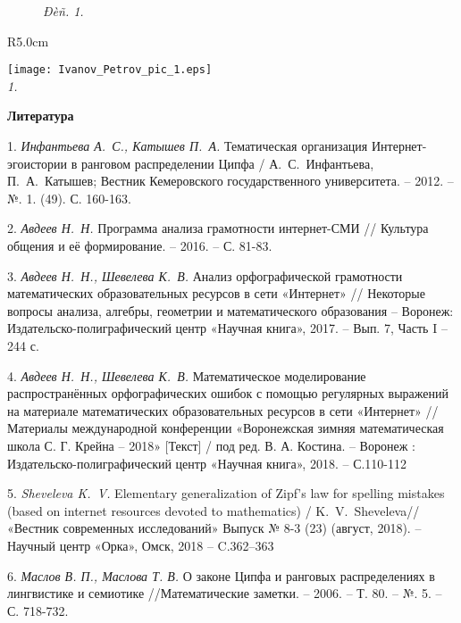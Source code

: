\documentclass[draft, 12pt]{article}
\begin{document}
\begin{figure}[h!]
\begin{center}
\emph{Ðèñ. 1. }
\end{center}
\end{figure}


\begin{wrapfigure}{R}{5.0cm}
\begin{center}
\texttt{[image: Ivanov\_Petrov\_pic\_1.eps]}\\
\emph{ 1.}\end{center}
\end{wrapfigure}




\bigskip\centerline{\bf Литература}


1.	\emph{Инфантьева А.~С., Катышев П.~А.} Тематическая организация Интернет-эгоистории в ранговом распределении Ципфа / А.~С.~Инфантьева, П.~А.~Катышев; Вестник Кемеровского государственного университета. – 2012. – №. 1. (49). С. 160-163.

2.	\emph{Авдеев Н.~Н.} Программа анализа грамотности интер\-нет\--СМИ // Культура общения и её формирование. – 2016. – С. 81-83.


3.	\emph{ Авдеев Н.~Н., Шевелева К.~В.} Анализ орфографической грамотности
математических образовательных ресурсов в сети «Интернет» // Некоторые вопросы анализа, алгебры, геометрии и математического
образования – Воронеж: Издательско-полиграфический центр «Научная книга», 2017. – Вып. 7, Часть I – 244 с.

4.	\emph{Авдеев Н.~Н., Шевелева К.~В.} Математическое моделирование распространённых орфографических ошибок с помощью регулярных выражений на материале математических образовательных ресурсов в сети «Интернет» // Материалы международной конференции  «Воронежская зимняя математическая школа С. Г. Крейна – 2018» [Текст] / под ред. В. А. Костина. – Воронеж : Издательско-полиграфический центр «Научная книга», 2018. –  С.110-112

5.	\emph{Sheveleva K.~V.} Elementary generalization of Zipf's law for spelling mistakes (based on internet resources devoted to mathematics)  / K.~V.~Sheveleva// «Вестник современных исследований»  Выпуск № 8-3 (23) (август, 2018). --  Научный центр «Орка»,  Омск, 2018 -- C.362--363

6.	\emph{Маслов В. П., Маслова Т. В.} О законе Ципфа и ранговых распределениях в лингвистике и семиотике //Математические заметки. – 2006. – Т. 80. – №. 5. – С. 718-732.
\end{document}
